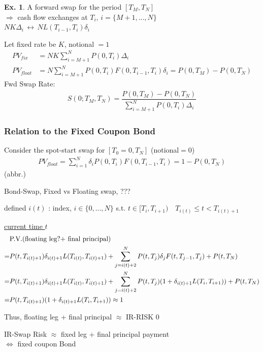 \documentclass[a4paper,11pt]{jsarticle}
\theoremstyle{definition}
\newtheorem{ex}{Ex.}[subsection]
\newcommand{\df}[2]{\dfrac{#1}{#2}}
\begin{document}
\begin{ex}
  A forward swap for the period $[T_M,T_N]$ \\
  $\Rightarrow$ cash flow exchanges
  at $T_i, \, i=\{M+1, ..., N\} $ \\
  $NK\Delta_i \, \leftrightarrow \, NL(T_{i-1},T_i)\delta_i$

  Let fixed rate be $K$, notional $=1$
  \begin{align}
    PV_{fix}&=NK\sum_{i=M+1}^N P(0,T_i)\Delta_i \\
    PV_{float}&=N\sum_{i=M+1}^N P(0,T_i)F(0,T_{i-1},T_i)
    \delta_i = P(0,T_M)-P(0,T_N)
  \end{align}
  Fwd Swap Rate:
  \begin{align}
    S(0;T_M,T_N)
    =\df{P(0,T_M)-P(0,T_N)}{\sum_{i=M+1}^N P(0,T_i)\Delta_i}
  \end{align}
\end{ex}


\subsubsection{Relation to the Fixed Coupon Bond}
Consider the spot-start swap for $[T_0=0, T_N]$ (notional$=0$)
\begin{align}
  PV_{float}=\sum_{i=1}^N \delta_i P(0,T_i)F(0,T_{i-1},T_i)
  =1-P(0,T_N)
\end{align}
(abbr.)


Bond-Swap, Fixed vs Floating swap, 
???

defined $i(t)$ : index, $i\in\{0,...,N\} $
s.t. $t\in[T_i,T_{i+1}) \quad T_{i(t)}\leq t < T_{i(t)+1}$

\underline{current time $t$}
\begin{align}
  &\mbox{P.V.(floating leg?+ final principal)} \notag \\
  =&P(t,T_{i(t)+1})\delta_{i(t)+1}L(T_{i(t)},T_{i(t)+1})
  +\sum_{j=i(t)+2}^N P(t,T_j)\delta_j F(t,T_{j-1},T_j)
  +P(t,T_N) \notag \\
  =&P(t,T_{i(t)+1})\delta_{i(t)+1}L(T_{i(t)},T_{i(t)+1})
  +\sum_{j=i(t)+2}^N P(t,T_j)(1+\delta_{i(t)+1}L(T_i,T_{i+1}))
  +P(t,T_N) \notag \\
  =&P(t,T_{i(t)+1})(1+\delta_{i(t)+1}L(T_i,T_{i+1}))
  \approx 1
\end{align}

Thus, floating leg + final principal $\approx$ IR-RISK $0$

IR-Swap Risk $\approx$ fixed leg + final principal payment \\
$\Leftrightarrow$ fixed coupon Bond
\end{document}
